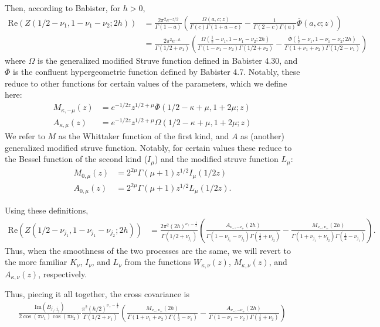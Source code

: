 \documentclass[11pt]{article}
\begin{document}
Then, according to Babister, for $h > 0$, \begin{align*}
\textrm{Re}(Z(1/2 - \nu_{1},1 - \nu_{1} - \nu_{2};2h)) &= \frac{2\pi^2e^{-z/2}}{\Gamma(1-a)}\left(\frac{\Omega(a,c;z)}{\Gamma(c)\Gamma(1+a-c)} - \frac{1}{\Gamma(2-c)\Gamma(a)}\overline{\Phi}(a,c;z)\right)\\
&= \frac{2\pi^2e^{-h}}{\Gamma(1/2 + \nu_{1})}\left(\frac{\Omega(\frac12 - \nu_{1},1 - \nu_{1} - \nu_{2};2h)}{\Gamma(1 - \nu_{1} - \nu_{2})\Gamma(1/2 + \nu_{2})} - \frac{\overline{\Phi}(\frac12 - \nu_{1},1 - \nu_{1} - \nu_{2};2h)}{\Gamma(1 + \nu_{1} + \nu_{2})\Gamma(1/2 - \nu_{1})}\right)
\end{align*}where $\Omega$ is the generalized modified Struve function defined in Babister 4.30, and $\overline{\Phi}$ is the confluent hypergeometric function defined by Babister 4.7. Notably, these reduce to other functions for certain values of the parameters, which we define here: \begin{align*}
M_{\kappa,- \mu}(z) &=  e^{-1/2 z}z^{1/2 +\mu}\overline{\Phi}(1/2- \kappa + \mu, 1 + 2\mu; z)\\
A_{\kappa, \mu}(z) &= e^{-1/2 z}z^{1/2 + \mu}\Omega(1/2- \kappa + \mu, 1 + 2\mu; z)
\end{align*}We refer to $M$ as the Whittaker function of the first kind, and $A$ as (another) generalized modified struve function. Notably, for certain values these reduce to the Bessel function of the second kind  ($I_\mu$) and the modified struve function $L_\mu$:\begin{align*}
M_{0,\mu}(z) &= 2^{2\mu}\Gamma(\mu + 1)z^{1/2}I_\mu(1/2 z)\\
A_{0,\mu}(z) &= 2^{2\mu}\Gamma(\mu + 1)z^{1/2}L_\mu(1/2 z).
\end{align*}

Using these definitions, \begin{align*}
\textrm{Re}(Z(1/2 - \nu_{j_1},1 - \nu_{j_1} - \nu_{j_2};2h)) &= \frac{2\pi^2(2h)^{\nu_+-\frac12}}{\Gamma(1/2 + \nu_{j_1})}\left(\frac{ A_{\nu_-,-\nu_+}(2h)}{\Gamma(1 - \nu_{j_1} - \nu_{j_2})\Gamma(\frac12 + \nu_{j_2})} - \frac{M_{\nu_-,\nu_+}(2h)}{\Gamma(1 + \nu_{j_1} + \nu_{j_2})\Gamma(\frac12 - \nu_{j_1})}\right).
\end{align*}Thus, when the smoothness of the two processes are the same, we will revert to the more familiar $K_\nu$, $I_\nu$, and $L_\nu$ from the functions $W_{\kappa, \nu}(z)$, $M_{\kappa, \nu}(z)$, and $A_{\kappa, \nu}(z)$, respectively.

Thus, piecing it all together, the cross covariance is \begin{align*}
\frac{\textrm{Im}(B_{j_1, j_2}) }{2\cos(\pi \nu_1)\cos(\pi \nu_2) }
\frac{\pi^2(h/2)^{\nu_+-\frac12}}{\Gamma(1/2 + \nu_{1})}\left(\frac{M_{\nu_-,\nu_+}(2h)}{\Gamma(1 + \nu_{1} + \nu_{2})\Gamma(\frac12 - \nu_{1})} - \frac{ A_{\nu_-,-\nu_+}(2h)}{\Gamma(1 - \nu_{1} - \nu_{2})\Gamma(\frac12 + \nu_{2})}\right)
\end{align*}
\end{document}
